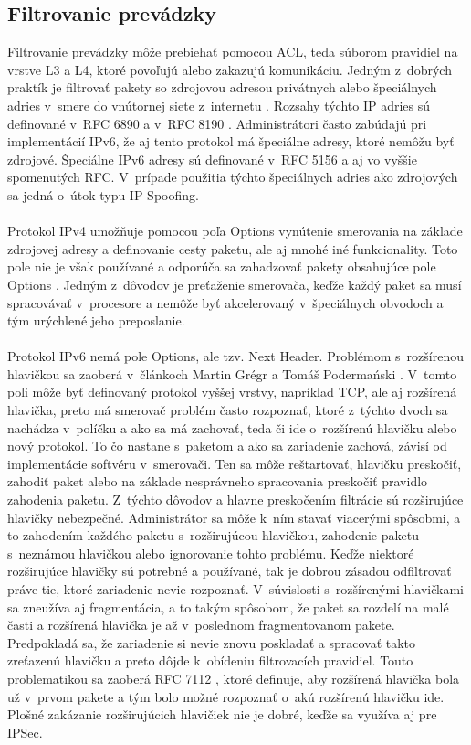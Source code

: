 \subsection{Filtrovanie prevádzky}
Filtrovanie prevádzky môže prebiehať pomocou ACL, teda súborom pravidiel na vrstve L3 a L4, ktoré povoľujú alebo zakazujú komunikáciu. Jedným z~dobrých praktík je filtrovať pakety so zdrojovou adresou privátnych alebo špeciálnych adries v~smere do vnútornej siete z~internetu \cite{Jackson2010}. Rozsahy týchto IP adries sú definované v~RFC 6890 \cite{rfc6890al6BqxiLuoAdpLeG} a v~RFC 8190 \cite{rfc8190O1cp1uhrCiYj0LYK}. Administrátori často zabúdajú pri implementácií IPv6, že aj tento protokol má špeciálne adresy, ktoré nemôžu byť zdrojové. Špeciálne IPv6 adresy sú definované v~RFC 5156 \cite{rfc5156lPYdBFaqWC5RwyJI} a aj vo vyššie spomenutých RFC. V~prípade použitia týchto špeciálnych adries ako zdrojových sa jedná o~útok typu IP Spoofing.
\\\\   
\noindent
Protokol IPv4 umožňuje pomocou poľa Options vynútenie smerovania na základe zdrojovej adresy a definovanie cesty paketu, ale aj mnohé iné funkcionality. Toto pole nie je však používané a odporúča sa zahadzovať pakety obsahujúce pole Options \cite{Singh2018}. Jedným z~dôvodov je preťaženie smerovača, keďže každý paket sa musí spracovávať v~procesore a nemôže byť akcelerovaný v~špeciálnych obvodoch a tým urýchlené jeho preposlanie. 
\\\\   
\noindent
Protokol IPv6 nemá pole Options, ale tzv. Next Header. Problémom s~rozšírenou hlavičkou sa zaoberá v~článkoch Martin Grégr a Tomáš Podermański \cite{Gregr2622015}\cite{Podermanski1922015}. V~tomto poli môže byť definovaný protokol vyššej vrstvy, napríklad TCP, ale aj rozšírená hlavička, preto má smerovač problém často rozpoznať, ktoré z~týchto dvoch sa nachádza v~políčku a ako sa má zachovať, teda či ide o~rozšírenú hlavičku alebo nový protokol. To čo nastane s~paketom a ako sa zariadenie zachová, závisí od implementácie softvéru v~smerovači. Ten sa môže reštartovať, hlavičku preskočiť, zahodiť paket alebo na základe nesprávneho spracovania preskočiť pravidlo zahodenia paketu. Z~týchto dôvodov a hlavne preskočením filtrácie sú rozširujúce hlavičky nebezpečné. Administrátor sa môže k~ním stavať viacerými spôsobmi, a to zahodením každého paketu s~rozširujúcou hlavičkou, zahodenie paketu s~neznámou hlavičkou alebo ignorovanie tohto problému. Keďže niektoré rozširujúce hlavičky sú potrebné a používané, tak je dobrou zásadou odfiltrovať práve tie, ktoré zariadenie nevie rozpoznať. V~súvislosti s~rozšírenými hlavičkami sa zneužíva aj fragmentácia, a to takým spôsobom, že paket sa rozdelí na malé časti a rozšírená hlavička je až v~poslednom fragmentovanom pakete. Predpokladá sa, že zariadenie si nevie znovu poskladať a spracovať takto zreťazenú hlavičku a preto dôjde k~obídeniu filtrovacích pravidiel. Touto problematikou sa zaoberá RFC 7112 \cite{L1L7agTQGYrRT6cd}, ktoré definuje, aby rozšírená hlavička bola už v~prvom pakete a tým bolo možné rozpoznať o~akú rozšírenú hlavičku ide. Plošné zakázanie rozširujúcich hlavičiek nie je dobré, keďže sa využíva aj pre IPSec.

